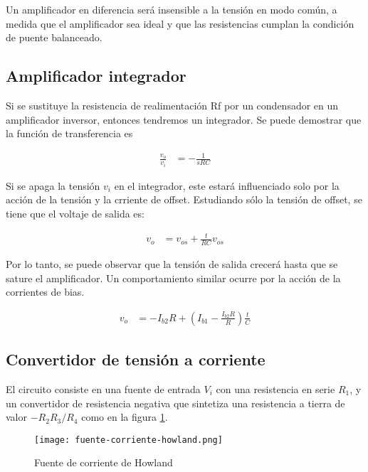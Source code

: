Un amplificador en diferencia será insensible a la tensión en modo común,
a medida que el amplificador sea ideal y que las resistencias cumplan la
condición de puente balanceado.

\subsection{Amplificador integrador}

Si se sustituye la resistencia de realimentación Rf por un condensador en un amplificador inversor, entonces tendremos un integrador. Se puede demostrar que la función de transferencia es

\begin{align*}
\frac{v_o}{v_i} &= -\frac{1}{sRC}
\end{align*}

Si se apaga la tensión $v_i$ en el integrador, este estará influenciado solo por la acción de la tensión y la crriente de offset. Estudiando sólo la tensión de offset, se tiene que el voltaje de salida es:

\begin{align*}
v_o &= v_{os} + \frac{t}{RC} v_{os}
\end{align*}

Por lo tanto, se puede observar que la tensión de salida crecerá hasta que se sature el amplificador. Un comportamiento similar ocurre por la acción de la corrientes de bias.

\begin{align*}
v_o &= -I_{b2}R + \left( I_{b1} - \frac{I_{b2}R}{R} \right) \frac{t}{C}
\end{align*}

\subsection{Convertidor de tensión a corriente}

El circuito consiste en una fuente de entrada $V_i$ con una resistencia en serie $R_1$, y un convertidor de resistencia negativa que sintetiza una resistencia a tierra de valor $-R_2 R_3 / R_4$ como en la figura \ref{fig:mt-fuente-corriente-howland}.

\begin{figure}
    \centering
    \texttt{[image: fuente-corriente-howland.png]}
    \caption{Fuente de corriente de Howland}
    \label{fig:mt-fuente-corriente-howland}
\end{figure}

